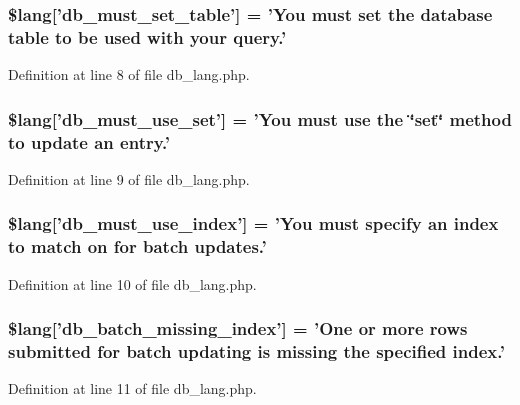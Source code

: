 \subsubsection[{\$lang}]{\setlength{\rightskip}{0pt plus 5cm}\$lang['db\-\_\-must\-\_\-set\-\_\-table'] = 'You must set the database table {\bf to} be used with your query.'}\label{db__lang_8php_a0f5d469f071f2b5327b44761f4a06396}


Definition at line 8 of file db\-\_\-lang.\-php.

\subsubsection[{\$lang}]{\setlength{\rightskip}{0pt plus 5cm}\$lang['db\-\_\-must\-\_\-use\-\_\-set'] = 'You must use the \char`\"{}set\char`\"{} method {\bf to} update an entry.'}\label{db__lang_8php_a55e22fb14cedc8ee7f70980bf7f37308}


Definition at line 9 of file db\-\_\-lang.\-php.

\subsubsection[{\$lang}]{\setlength{\rightskip}{0pt plus 5cm}\$lang['db\-\_\-must\-\_\-use\-\_\-index'] = 'You must specify an index {\bf to} match on {\bf for} batch updates.'}\label{db__lang_8php_a708419b6b94728c30474ee5fdde3b99b}


Definition at line 10 of file db\-\_\-lang.\-php.

\subsubsection[{\$lang}]{\setlength{\rightskip}{0pt plus 5cm}\$lang['db\-\_\-batch\-\_\-missing\-\_\-index'] = 'One {\bf or} more rows submitted {\bf for} batch updating is missing the specified index.'}\label{db__lang_8php_af946769a3dd5679c60e6f2ef5f7a5aa1}


Definition at line 11 of file db\-\_\-lang.\-php.

